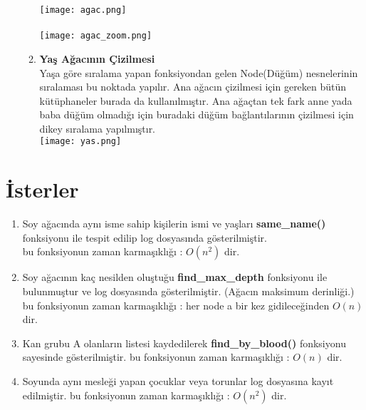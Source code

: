 \documentclass[conference]{IEEEtran}
\begin{document}
\begin{enumerate}
\begin{enumerate}
        \texttt{[image: agac.png]}\\\\
        \texttt{[image: agac\_zoom.png]}
        \item \textbf{Yaş Ağacının Çizilmesi}\\
        Yaşa göre sıralama yapan fonksiyondan gelen Node(Düğüm) nesnelerinin sıralaması bu noktada yapılır. Ana ağacın çizilmesi için gereken bütün kütüphaneler burada da kullanılmıştır. Ana ağaçtan tek fark anne yada baba düğüm olmadığı için buradaki düğüm bağlantılarının çizilmesi için dikey sıralama yapılmıştır.\\
        \texttt{[image: yas.png]}
    \end{enumerate}  
\end{enumerate}

\section{\textbf{İsterler}}
\begin{enumerate}
     olmayan düğümlerin listesi yaş sıralamasına göre kaydedilmesi işleminde : \textbf{depth\_first\_age()} fonksiyonu kullanılmıştır, fonksiyon parametre olarak Depth first algoritması gereği \textbf{Kök} Node'unu ve içerisini doldurup geri döndürmek için sıralanmışçocuklar \textbf{Arraylist}'i alır. Fonksiyon Kök Node'undan başlayarak öncelikle çocuklar listesinin kontrolünü yapar eğer liste boş değil ise; fonksiyonu her bir çocuk için tekrar çağırır. eğer Kök Node'un çocuklar listesi boş ise, ekleme adımına geçilir. Ekleme adımında, daha önce ekleme yapılmamışsa direkt eklenir. eğer ekleme yapıldıysa boyut karşılaştırılması yapılır ve kişi listedeki kendisinden küçük en büyük yaştaki kişinin yanına eklenir. Tüm bu işlemler adım adım \textbf{Log.txt} dosyasına kaydedilir.
    bu fonksiyonun zaman karmaşıklığı : \textbf{$O(V+E)$} dir, V Node sayısı, E Çocuk sayısı.
    \item Soy ağacında aynı isme sahip kişilerin ismi ve yaşları \textbf{same\_name()} fonksiyonu ile tespit edilip log dosyasında gösterilmiştir.\\
    bu fonksiyonun zaman karmaşıklığı : \textbf{$O(n^2)$} dir.
    \item Soy ağacının kaç nesilden oluştuğu \textbf{find\_max\_depth} fonksiyonu ile bulunmuştur ve log dosyasında gösterilmiştir. (Ağacın maksimum derinliği.)
    bu fonksiyonun zaman karmaşıklığı : her node a bir kez gidileceğinden \textbf{$O(n)$} dir.
    \item Kan grubu A olanların listesi kaydedilerek \textbf{find\_by\_blood()} fonksiyonu sayesinde gösterilmiştir.
    bu fonksiyonun zaman karmaşıklığı : \textbf{$O(n)$} dir.
    \item Soyunda aynı mesleği yapan çocuklar veya torunlar log dosyasına kayıt edilmiştir.
    bu fonksiyonun zaman karmaşıklığı : \textbf{$O(n^2)$} dir.
    
\end{enumerate}
\end{document}
